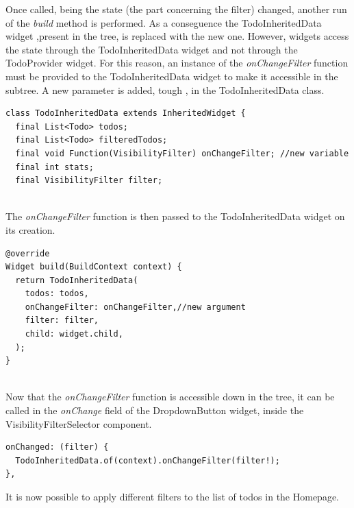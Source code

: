 Once called, being the state (the part concerning the filter) changed, another run of the \textit{build} method is performed. As a conseguence the TodoInheritedData widget ,present in the tree, is replaced with the new one.
However, widgets access the state through the TodoInheritedData widget and not through the TodoProvider widget. For this reason,
an instance of the \textit{onChangeFilter   }function must be provided to the TodoInheritedData widget to make it accessible in the subtree. A new parameter is added, tough , in the TodoInheritedData class.
\mbox{}\\
\begin{code}
\mbox{}
\label{code:2.24}
\begin{verbatim}
class TodoInheritedData extends InheritedWidget {
  final List<Todo> todos;
  final List<Todo> filteredTodos;
  final void Function(VisibilityFilter) onChangeFilter; //new variable
  final int stats;
  final VisibilityFilter filter;
\end{verbatim}
\end{code}
\mbox{}\\
The \textit{onChangeFilter} function is then passed to the TodoInheritedData widget on its creation.
 \mbox{}\\
\mbox{}
\begin{code}
\label{code:2.25}
\begin{verbatim}
@override
Widget build(BuildContext context) {
  return TodoInheritedData(
    todos: todos,
    onChangeFilter: onChangeFilter,//new argument
    filter: filter,
    child: widget.child,
  );
}

\end{verbatim}
\end{code}
 \mbox{}\\
Now that the \textit{onChangeFilter   }function is accessible down in the tree, it can be called in the \textit{onChange }field of the DropdownButton widget, inside the VisibilityFilterSelector component.
\mbox{}\\
\mbox{}
\begin{code}

\label{code:2.26}
\begin{verbatim}
onChanged: (filter) {
  TodoInheritedData.of(context).onChangeFilter(filter!);
},
\end{verbatim}
\end{code}
\mbox{}
It is now possible to apply different filters to the list of todos in the Homepage. 


